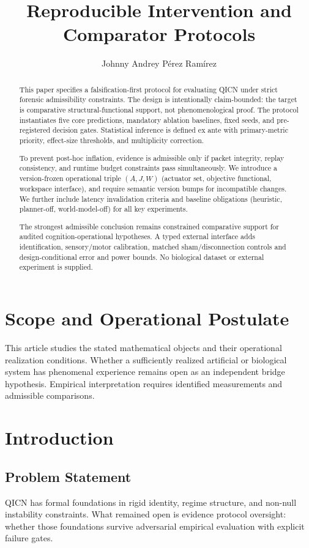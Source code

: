 \documentclass[11pt,a4paper]{article}
\title{\textbf{Reproducible Intervention and Comparator Protocols}}
\author{Johnny Andrey P\'{e}rez Ram\'{i}rez}
\date{}
\theoremstyle{definition}
\begin{document}
\setlength{\emergencystretch}{3em}
\maketitle

\begin{abstract}
This paper specifies a falsification-first protocol for evaluating QICN under strict forensic admissibility constraints. The design is intentionally claim-bounded: the target is comparative structural-functional support, not phenomenological proof. The protocol instantiates five core predictions, mandatory ablation baselines, fixed seeds, and pre-registered decision gates. Statistical inference is defined ex ante with primary-metric priority, effect-size thresholds, and multiplicity correction.

To prevent post-hoc inflation, evidence is admissible only if packet integrity, replay consistency, and runtime budget constraints pass simultaneously. We introduce a version-frozen operational triple $(A, J, W)$ (actuator set, objective functional, workspace interface), and require semantic version bumps for incompatible changes. We further include latency invalidation criteria and baseline obligations (heuristic, planner-off, world-model-off) for all key experiments.

The strongest admissible conclusion remains constrained comparative support for audited cognition-operational hypotheses. 
A typed external interface adds identification, sensory/motor calibration, matched sham/disconnection controls and design-conditional error and power bounds. No biological dataset or external experiment is supplied.
\end{abstract}

\section*{Scope and Operational Postulate}
This article studies the stated mathematical objects and their operational
realization conditions. Whether a sufficiently realized artificial or biological
system has phenomenal experience remains open as an independent bridge
hypothesis. Empirical interpretation requires identified measurements and
admissible comparisons.

\section{Introduction}
\subsection{Problem Statement}
QICN has formal foundations in rigid identity, regime structure, and non-null instability constraints. What remained open is evidence protocol oversight: whether those foundations survive adversarial empirical evaluation with explicit failure gates.
\end{document}
